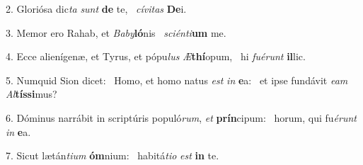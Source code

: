 2. Gloriósa dic\textit{ta} \textit{sunt} \textbf{de} te, \ast\  \textit{cí}\textit{vi}\textit{tas} \textbf{De}i.\

3. Memor ero Rahab, et \textit{Ba}\textit{by}\textbf{ló}nis \ast\  \textit{sci}\textit{én}\textit{ti}\textbf{um} me.\

4. Ecce alienígenæ, et Tyrus, et pópu\textit{lus} \textit{Æ}\textbf{thí}opum, \ast\  hi \textit{fu}\textit{é}\textit{runt} \textbf{il}lic.\

5. Numquid Sion dicet: \dag\  Homo, et homo natus \textit{est} \textit{in} \textbf{e}a: \ast\  et ipse fundávit \textit{e}\textit{am} \textit{Al}\textbf{tís}\textbf{si}mus?\

6. Dóminus narrábit in scriptúris populó\textit{rum}, \textit{et} \textbf{prín}cipum: \ast\  horum, qui fu\textit{é}\textit{runt} \textit{in} \textbf{e}a.\

7. Sicut lætán\textit{ti}\textit{um} \textbf{óm}nium: \ast\  habitá\textit{ti}\textit{o} \textit{est} \textbf{in} te.\

